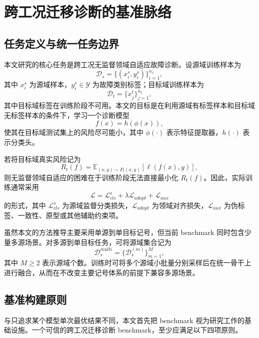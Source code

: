 \chapter{跨工况迁移诊断的基准脉络}

\section{任务定义与统一任务边界}
本文研究的核心任务是跨工况无监督领域自适应故障诊断。设源域训练样本为
\begin{equation}
\mathcal{D}_s=\{(x_i^s,y_i^s)\}_{i=1}^{n_s},
\end{equation}
其中 $x_i^s$ 为源域样本，$y_i^s\in\mathcal{Y}$ 为故障类别标签；目标域训练样本为
\begin{equation}
\mathcal{D}_t=\{x_j^t\}_{j=1}^{n_t},
\end{equation}
其中目标域标签在训练阶段不可用。本文的目标是在利用源域有标签样本和目标域无标签样本的条件下，学习一个诊断模型
\begin{equation}
f(x)=h(\phi(x)),
\end{equation}
使其在目标域测试集上的风险尽可能小，其中 $\phi(\cdot)$ 表示特征提取器，$h(\cdot)$ 表示分类头。

若将目标域真实风险记为
\begin{equation}
R_t(f)=\mathbb{E}_{(x,y)\sim P_t(x,y)}[\ell(f(x),y)],
\end{equation}
则无监督领域自适应的困难在于训练阶段无法直接最小化 $R_t(f)$。因此，实际训练通常采用
\begin{equation}
\mathcal{L}=\mathcal{L}_{cls}^{s}+\lambda\mathcal{L}_{adapt}+\mathcal{L}_{aux}
\end{equation}
的形式，其中 $\mathcal{L}_{cls}^{s}$ 为源域监督分类损失，$\mathcal{L}_{adapt}$ 为领域对齐损失，$\mathcal{L}_{aux}$ 为伪标签、一致性、原型或其他辅助约束项。

虽然本文的方法推导主要采用单源到单目标记号，但当前 benchmark 同时包含少量多源场景。对多源到单目标任务，可将源域集合记为
\begin{equation}
\mathcal{D}_{s}^{multi}=\{\mathcal{D}_{s}^{(m)}\}_{m=1}^{M},
\end{equation}
其中 $M\ge 2$ 表示源域个数。训练时可将多个源域小批量分别采样后在统一骨干上进行融合，从而在不改变主要记号体系的前提下兼容多源场景。

\section{基准构建原则}
与只追求某个模型单次最优结果不同，本文首先把 benchmark 视为研究工作的基础设施。一个可信的跨工况迁移诊断 benchmark，至少应满足以下四项原则。

